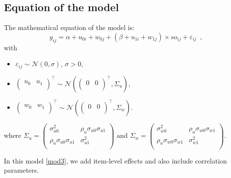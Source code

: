 \documentclass{article}
\begin{document}
\subsection{Equation of the model}
The mathematical equation of the model is:
\begin{equation}
    y_{ij}= \alpha + u_{0i} + w_{0j}+(\beta + u_{1i} + w_{1j}) \times so_{ij} + \varepsilon_{ij}\enspace,\label{mod3}
\end{equation}
with 
\begin{itemize}
    \item $\varepsilon_{ij} \sim \mathcal{N}(0, \sigma)$, $\sigma>0$,
    \item
    $\begin{pmatrix}
    u_0 & u_1\\
    \end{pmatrix}^{\top}\sim \mathcal{N}\left(\begin{pmatrix}
    0 & 0\\
    \end{pmatrix}^{\top},\Sigma_u\right)$,
    \item 
    $\begin{pmatrix}
    w_0 & w_1\\
    \end{pmatrix}^{\top}\sim \mathcal{N}\left(\begin{pmatrix}
    0 & 0\\
    \end{pmatrix}^{\top},\Sigma_w\right)$.
\end{itemize}
where $\Sigma_u=\begin{pmatrix}
\sigma_{u0}^2  & \rho_u\sigma_{u0}\sigma_{u1}\\
\rho_u\sigma_{u0}\sigma_{u1} & \sigma_{u1}^2\\
\end{pmatrix} \text{ and } \Sigma_w=\begin{pmatrix}
\sigma_{w0}^2  & \rho_u\sigma_{w0}\sigma_{w1}\\
\rho_u\sigma_{w0}\sigma_{w1} & \sigma_{w1}^2\\
\end{pmatrix} $.

In this model \eqref{mod3}, we add item-level effects and also include correlation parameters.
\end{document}
